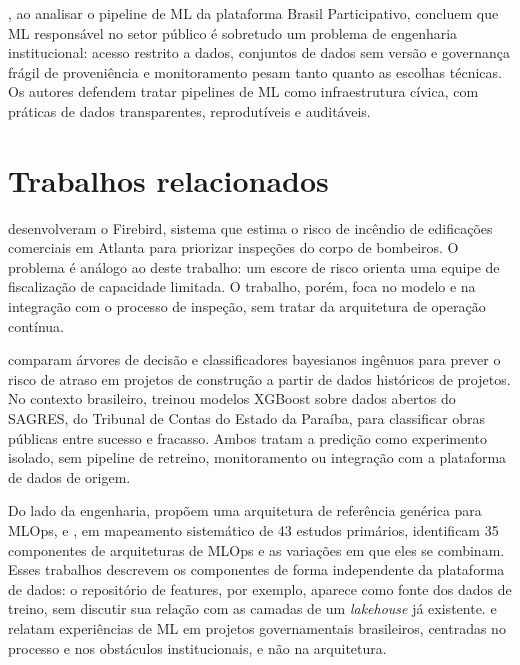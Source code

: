 , ao analisar o pipeline de ML da plataforma Brasil Participativo, concluem que ML responsável no setor público é sobretudo um problema de engenharia institucional: acesso restrito a dados, conjuntos de dados sem versão e governança frágil de proveniência e monitoramento pesam tanto quanto as escolhas técnicas. Os autores defendem tratar pipelines de ML como infraestrutura cívica, com práticas de dados transparentes, reprodutíveis e auditáveis.

\section{Trabalhos relacionados}
\label{sec:relacionados}

 desenvolveram o Firebird, sistema que estima o risco de incêndio de edificações comerciais em Atlanta para priorizar inspeções do corpo de bombeiros. O problema é análogo ao deste trabalho: um escore de risco orienta uma equipe de fiscalização de capacidade limitada. O trabalho, porém, foca no modelo e na integração com o processo de inspeção, sem tratar da arquitetura de operação contínua.

 comparam árvores de decisão e classificadores bayesianos ingênuos para prever o risco de atraso em projetos de construção a partir de dados históricos de projetos. No contexto brasileiro,  treinou modelos XGBoost sobre dados abertos do SAGRES, do Tribunal de Contas do Estado da Paraíba, para classificar obras públicas entre sucesso e fracasso. Ambos tratam a predição como experimento isolado, sem pipeline de retreino, monitoramento ou integração com a plataforma de dados de origem.

Do lado da engenharia,  propõem uma arquitetura de referência genérica para MLOps, e , em mapeamento sistemático de 43 estudos primários, identificam 35 componentes de arquiteturas de MLOps e as variações em que eles se combinam. Esses trabalhos descrevem os componentes de forma independente da plataforma de dados: o repositório de features, por exemplo, aparece como fonte dos dados de treino, sem discutir sua relação com as camadas de um \textit{lakehouse} já existente.  e  relatam experiências de ML em projetos governamentais brasileiros, centradas no processo e nos obstáculos institucionais, e não na arquitetura.

